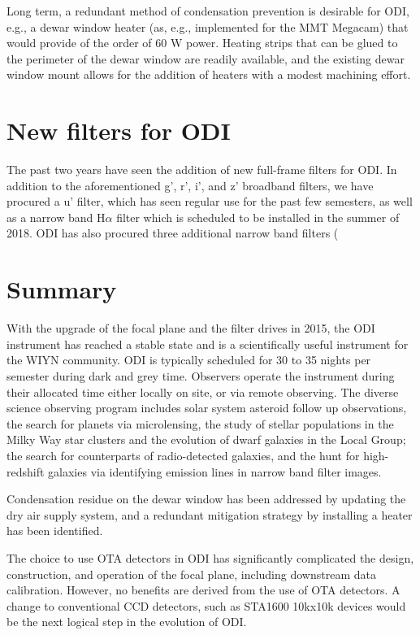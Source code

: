 \documentclass[]{spieman}
\begin{document}
Long term, a redundant method of condensation prevention is desirable for
ODI, e.g., a dewar window heater (as, e.g., implemented for the MMT 
Megacam\cite{McLeod2015}) that would provide of the
order of 60 W power. Heating strips that can be glued to the perimeter of the
dewar window are readily available, and the existing dewar window mount allows
for the addition of heaters with a modest machining effort.

\section{New filters for ODI}

The past two years have seen the addition of new full-frame filters for ODI.  In addition to the aforementioned g', r', i', and z' broadband filters, we have procured a u' filter, which has seen regular use for the past few semesters, as well as a narrow band H$\alpha$ filter which is scheduled to be installed in the summer of 2018. ODI has also procured three additional narrow band filters (

\section{Summary}

With the upgrade of the focal plane and the filter drives in 2015, the ODI
instrument has reached a stable state and is a scientifically useful instrument
for the WIYN community. ODI is typically scheduled for 30 to 35 nights per
semester during dark and grey time. Observers operate the instrument during
their allocated time either locally on site, or via remote observing. The
diverse science observing program includes solar system asteroid follow up
observations, the search for planets via microlensing, the study of stellar
populations in the  Milky Way star clusters and the evolution of dwarf galaxies
in the Local Group; the search for  counterparts of radio-detected galaxies, and
the hunt for high-redshift galaxies via identifying emission lines in narrow
band filter images.

Condensation residue on the dewar window has been addressed by updating the
dry air supply system, and a redundant  mitigation strategy by installing
a heater has been identified. 

The choice to use  OTA detectors in ODI has significantly complicated the
design, construction, and operation of the focal plane, including downstream
data calibration. However, no benefits are derived from the use of OTA
detectors.  A change to conventional CCD detectors, such as STA1600 10kx10k
devices would be the next logical step in the evolution of ODI.



 

\end{document}
